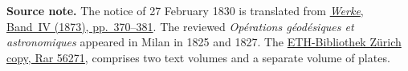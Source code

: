 \par\medskip\begin{small}\noindent\textbf{Source note.} The notice of 27 February 1830 is translated from \href{https://gdz.sub.uni-goettingen.de/id/PPN236005081}{\textit{Werke}, Band~IV (1873), pp.~370--381}. The reviewed \textit{Opérations géodésiques et astronomiques} appeared in Milan in 1825 and 1827. The \href{https://doi.org/10.3931/e-rara-139800}{ETH-Bibliothek Zürich copy, Rar 56271}, comprises two text volumes and a separate volume of plates.\par\end{small}
